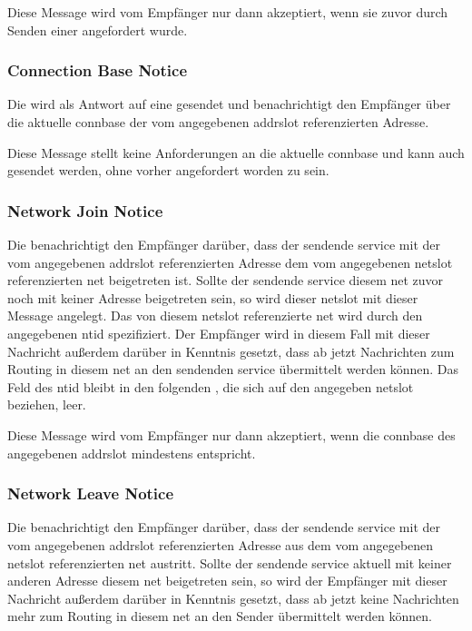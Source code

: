 Diese Message wird vom Empfänger nur dann akzeptiert, wenn sie zuvor durch Senden einer
\msg{\isprotoccreq} angefordert wurde.

\isprotoccrepbytefield


\subsubsection{Connection Base Notice}
\label{dcl-isproto-cbn}
Die \msg{\isprotocbn} wird als Antwort auf eine \msg{\isprotoccrep} gesendet und benachrichtigt
den Empfänger über die aktuelle \gls{connbase} der vom angegebenen \gls{addrslot} referenzierten
Adresse.

Diese Message stellt keine Anforderungen an die aktuelle \gls{connbase} und kann auch gesendet
werden, ohne vorher angefordert worden zu sein.

\isprotocbnbytefield


\subsubsection{Network Join Notice}
\label{dcl-isproto-njn}
Die \msg{\isprotonjn} benachrichtigt den Empfänger darüber, dass der sendende \gls{service} mit der
vom angegebenen \gls{addrslot} referenzierten Adresse dem vom angegebenen \gls{netslot} referenzierten
\gls{net} beigetreten ist. Sollte der sendende \gls{service} diesem \gls{net} zuvor noch mit keiner
Adresse beigetreten sein, so wird dieser \gls{netslot} mit dieser Message angelegt. Das von diesem
\gls{netslot} referenzierte \gls{net} wird durch den angegebenen \gls{ntid} spezifiziert.
Der Empfänger wird in diesem Fall mit dieser Nachricht außerdem darüber in Kenntnis gesetzt, dass
ab jetzt Nachrichten zum Routing in diesem \gls{net} an den sendenden \gls{service} übermittelt
werden können.
Das Feld des \gls{ntid} bleibt in den folgenden \msgpl{\isprotonjn}, die sich auf den angegeben
\gls{netslot} beziehen, leer.

Diese Message wird vom Empfänger nur dann akzeptiert, wenn die \gls{connbase} des angegebenen
\gls{addrslot} mindestens  entspricht.

\isprotonjnbytefield

\subsubsection{Network Leave Notice}
\label{dcl-isproto-nln}
Die \msg{\isprotonln} benachrichtigt den Empfänger darüber, dass der sendende \gls{service} mit der
vom angegebenen \gls{addrslot} referenzierten Adresse aus dem vom angegebenen \gls{netslot}
referenzierten \gls{net} austritt. Sollte der sendende \gls{service} aktuell mit keiner anderen
Adresse diesem \gls{net} beigetreten sein, so wird der Empfänger mit dieser Nachricht außerdem
darüber in Kenntnis gesetzt, dass ab jetzt keine Nachrichten mehr zum Routing in diesem \gls{net}
an den Sender übermittelt werden können.

